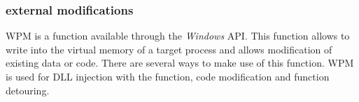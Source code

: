 \subsubsection{ external modifications}
\gls{WPM} is a function available through the \emph{Windows} \gls{API}. This function allows to write into the virtual memory of a target process and allows modification of existing data or code. There are several ways to make use of this function. \gls{WPM} is used for \gls{DLL} injection with the  function, code modification and function detouring. 


